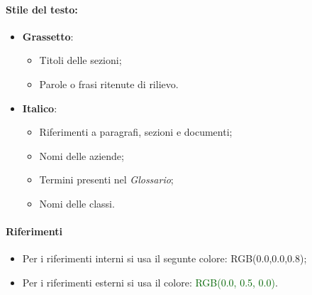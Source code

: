 \paragraph*{Stile del testo:}
\begin{itemize}
    \item \textbf{Grassetto}:
    \begin{itemize}
        \item Titoli delle sezioni;
        \item Parole o frasi ritenute di rilievo.
    \end{itemize}
    \item \textbf{Italico}:
    \begin{itemize}
        \item Riferimenti a paragrafi, sezioni e documenti;
        \item Nomi delle aziende;
        \item Termini presenti nel \textit{Glossario};
        \item Nomi delle classi.
    \end{itemize}
\end{itemize}

\paragraph*{Riferimenti}
    \begin{itemize}
        \item Per i riferimenti interni si usa il segunte colore: \textcolor{navyblue}{RGB(0.0,0.0,0.8)};
        \item Per i riferimenti esterni si usa il colore: \textcolor{darkgreen}{RGB(0.0, 0.5, 0.0)}.
\end{itemize}

